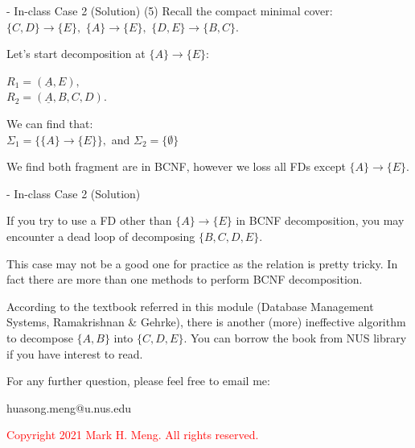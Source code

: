 \begin{frame}[fragile]{ - In-class Case 2 (Solution)}
	(5) Recall the compact minimal cover:\\
	
	$\{C,D\} \rightarrow \{E\},$
	$\{A\}  \rightarrow \{E\},$
	$\{D,E\} \rightarrow \{B,C\}.$\\\vspace{2pt}
	
	Let's start decomposition at $\{A\} \rightarrow \{E\}$:\\\vspace{2pt}
		
	$R_1 = (\underline{A}, E),$\\
	$R_2 = (\underline{A}, B, C, D).$\\\vspace{2pt}
	
	We can find that:\\\vspace{5pt}
	$\Sigma_1 = \{\{A\}\rightarrow\{E\}\},$ and
	$\Sigma_2 = \{ \emptyset \}$\\ \vspace{2pt}
	
	We find both fragment are in BCNF, however we loss all FDs except $\{A\}\rightarrow\{E\}$.\\ \vspace{2pt}
		
\end{frame}

\begin{frame}[fragile]{ - In-class Case 2 (Solution)}
	
	If you try to use a FD other than $\{A\}  \rightarrow \{E\}$ in BCNF decomposition, you may encounter a dead loop of decomposing $\{B,C,D,E\}$.\\\vspace{10pt}
	
	This case may not be a good one for practice as the relation is pretty tricky. In fact there are more than one methods to perform BCNF decomposition. \\\vspace{10pt}
	
	According to the textbook referred in this module (Database Management Systems, Ramakrishnan \& Gehrke), there is another (more) ineffective algorithm to decompose $\{A,B\}$ into $\{C,D,E\}$. You can borrow the book from NUS library if you have interest to read.
	
\end{frame}

\begin{frame}{}
	\centering  
	For any further question, please feel free to email me:\vspace{10pt}
	
	huasong.meng@u.nus.edu\\\vspace{3pt}
	
	\begin{tcolorbox}
		\begin{center}
			\textcolor{red}{Copyright 2021 Mark H. Meng. All rights reserved.}
		\end{center}
	\end{tcolorbox}
\end{frame}